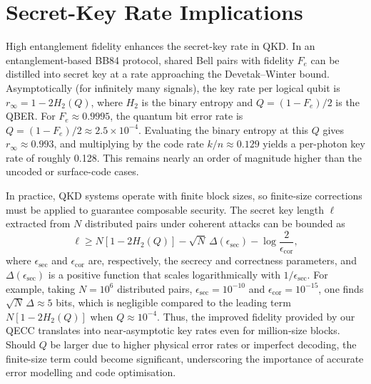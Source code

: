 \documentclass[conference]{IEEEtran}  %
\begin{document}
\section{Secret-Key Rate Implications}\label{sec:finitekey}
High entanglement fidelity enhances the secret-key rate in QKD.  In an entanglement-based BB84 protocol, shared Bell pairs with fidelity $F_e$ can be distilled into secret key at a rate approaching the Devetak–Winter bound\cite{Devetak2005,Pirandola2020}.  Asymptotically (for infinitely many signals), the key rate per logical qubit is $r_\infty = 1 - 2 H_2(Q)$, where $H_2$ is the binary entropy and $Q=(1-F_e)/2$ is the QBER.  For $F_e \approx 0.9995$, the quantum bit error rate is $Q=(1-F_e)/2 \approx 2.5\times 10^{-4}$.  Evaluating the binary entropy at this $Q$ gives $r_\infty \approx 0.993$, and multiplying by the code rate $k/n \approx 0.129$ yields a per-photon key rate of roughly 0.128.  This remains nearly an order of magnitude higher than the uncoded or surface-code cases.

In practice, QKD systems operate with finite block sizes, so finite-size corrections must be applied to guarantee composable security.  The secret key length $\ell$ extracted from $N$ distributed pairs under coherent attacks can be bounded as\cite{Pirandola2020}
\begin{equation}
    \ell \geq N \left[1 - 2 H_2(Q)\right] - \sqrt{N}\,\Delta(\epsilon_{\text{sec}}) - \log\frac{2}{\epsilon_{\text{cor}}},
\end{equation}
where $\epsilon_{\text{sec}}$ and $\epsilon_{\text{cor}}$ are, respectively, the secrecy and correctness parameters, and $\Delta(\epsilon_{\text{sec}})$ is a positive function that scales logarithmically with $1/\epsilon_{\text{sec}}$.  For example, taking $N=10^6$ distributed pairs, $\epsilon_{\text{sec}}=10^{-10}$ and $\epsilon_{\text{cor}}=10^{-15}$, one finds $\sqrt{N}\,\Delta \approx 5$ bits, which is negligible compared to the leading term $N [1 - 2 H_2(Q)]$ when $Q\approx 10^{-4}$.  Thus, the improved fidelity provided by our QECC translates into near‑asymptotic key rates even for million‑size blocks.  Should $Q$ be larger due to higher physical error rates or imperfect decoding, the finite-size term could become significant, underscoring the importance of accurate error modelling and code optimisation.
\end{document}
